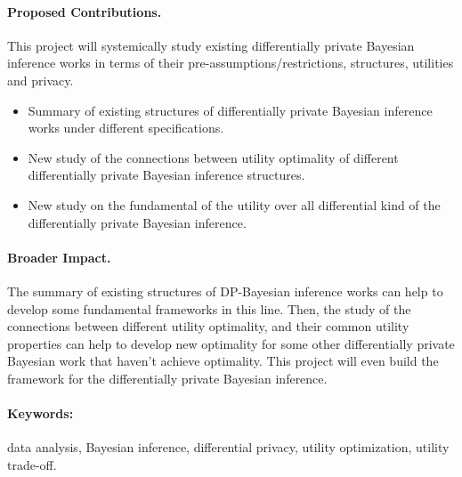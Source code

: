 \documentclass{article}
\begin{document}
\paragraph{Proposed Contributions.}
This project will systemically study existing differentially private Bayesian inference works in terms of their pre-assumptions/restrictions, structures, utilities and privacy.

\begin{itemize}
	\item Summary of existing structures of differentially private Bayesian inference works under different specifications.
%
	\item New study of the connections between utility optimality of different differentially private Bayesian inference structures. 
%	
	\item New study on the fundamental of the utility over all differential kind of the differentially private Bayesian inference.
%
\end{itemize}

\paragraph{Broader Impact.} The summary of existing structures of DP-Bayesian inference works can help to develop some fundamental frameworks in this line. Then, the study of the connections between different utility optimality, and their common utility properties can help to develop new optimality for some other differentially private Bayesian work that haven't achieve optimality. This project will even build the framework for the differentially private Bayesian inference.

\paragraph{Keywords:} data analysis, Bayesian inference, differential privacy, utility optimization, utility trade-off.

\newpage


\end{document}
